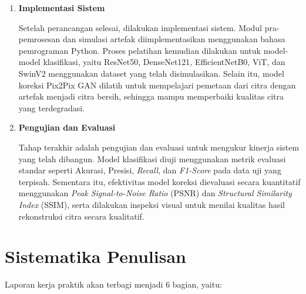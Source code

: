 \begin{enumerate}[nolistsep]
  \item \textbf{Implementasi Sistem}

  Setelah perancangan selesai, dilakukan implementasi sistem. Modul pra-pemrosesan dan simulasi artefak diimplementasikan menggunakan bahasa pemrograman Python. Proses pelatihan kemudian dilakukan untuk model-model klasifikasi, yaitu ResNet50, DenseNet121, EfficientNetB0, ViT, dan SwinV2 menggunakan dataset yang telah disimulasikan. Selain itu, model koreksi Pix2Pix GAN dilatih untuk mempelajari pemetaan dari citra dengan artefak menjadi citra bersih, sehingga mampu memperbaiki kualitas citra yang terdegradasi.

  \item \textbf{Pengujian dan Evaluasi}

  Tahap terakhir adalah pengujian dan evaluasi untuk mengukur kinerja sistem yang telah dibangun. Model klasifikasi diuji menggunakan metrik evaluasi standar seperti Akurasi, Presisi, \textit{Recall}, dan \textit{F1-Score} pada data uji yang terpisah. Sementara itu, efektivitas model koreksi dievaluasi secara kuantitatif menggunakan \textit{Peak Signal-to-Noise Ratio} (PSNR) dan \textit{Structural Similarity Index} (SSIM), serta dilakukan inspeksi visual untuk menilai kualitas hasil rekonstruksi citra secara kualitatif.

\end{enumerate}

\section{Sistematika Penulisan}

Laporan kerja praktik akan terbagi menjadi 6 bagian, yaitu:

